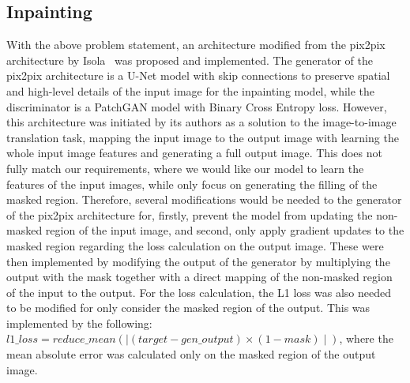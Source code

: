 \documentclass[10pt,twocolumn,letterpaper]{article}
\begin{document}
\subsection{Inpainting}

With the above problem statement, an architecture modified from the pix2pix architecture by Isola~\etal\cite{Isola2018} was proposed and implemented. The generator of the pix2pix architecture is
a U-Net model with skip connections to preserve spatial and high-level details of the input image for the inpainting model, while the discriminator is a PatchGAN
model with Binary Cross Entropy loss. However, this architecture was initiated by its authors as a solution to the image-to-image translation task, mapping the input image to the output image 
with learning the whole input image features and generating a full output image. This does not fully match our requirements, where we would like our model to learn the features of the input images, 
while only focus on generating the filling of the masked region. Therefore, several modifications would be needed to the generator of the pix2pix architecture for, firstly, prevent the model from updating
the non-masked region of the input image, and second, only apply gradient updates to the masked region regarding the loss calculation on the output image. These were then implemented by modifying 
the output of the generator by multiplying the output with the mask together with a direct mapping of the non-masked region of the input to the output. For the loss calculation, the L1 loss was 
also needed to be modified for only consider the masked region of the output. This was implemented by the following: $l1\_loss = reduce\_mean(\mid(target - gen\_output) \times (1 - mask)\mid)$, 
where the mean absolute error was calculated only on the masked region of the output image.
\end{document}
